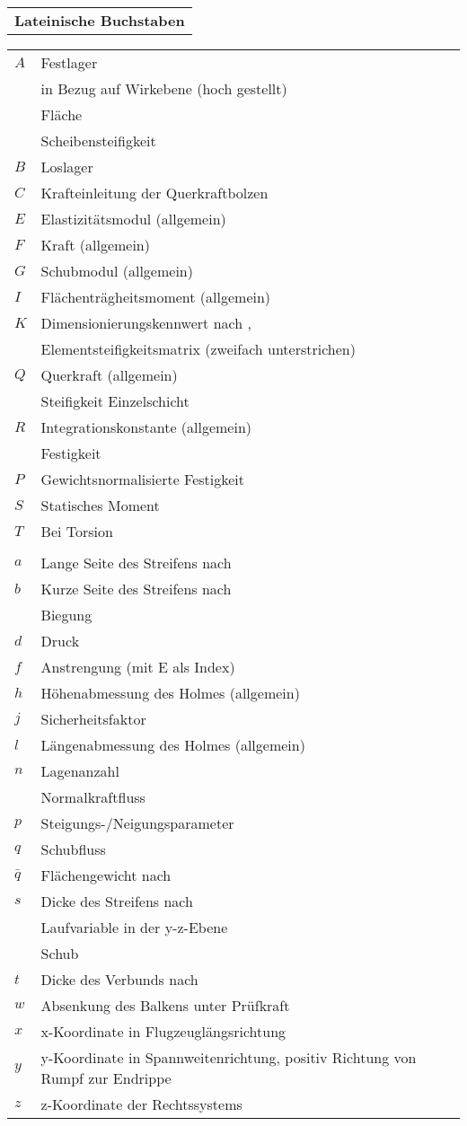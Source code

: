 \begin{longtable}[l]{l}
\onehalfspacing
\textbf{Lateinische Buchstaben}
\end{longtable}
\begin{longtable}[l]{ll}
\onehalfspacing
$ A $&Festlager\\
&in Bezug auf Wirkebene (hoch gestellt)\\
&Fläche\\
&Scheibensteifigkeit\\
$ B $&Loslager\\
$ C $&Krafteinleitung der Querkraftbolzen\\
$ E $&Elastizitätsmodul (allgemein)\\
$ F $&Kraft (allgemein)\\
$ G $&Schubmodul (allgemein)\\
$ I $&Flächenträgheitsmoment (allgemein)\\
$ K $&Dimensionierungskennwert nach \cite{item5},\\
 &Elementsteifigkeitsmatrix (zweifach unterstrichen)\\
$ Q $&Querkraft (allgemein)\\
&Steifigkeit Einzelschicht\\
$ R $&Integrationskonstante (allgemein)\\
&Festigkeit\\
$ P $&Gewichtsnormalisierte Festigkeit\\
$ S $&Statisches Moment\\
$ T $&Bei Torsion\\
& \\
$ a $&Lange Seite des Streifens nach \cite{item1}\\
$ b $&Kurze Seite des Streifens nach \cite{item1}\\
&Biegung\\
$ d$& Druck\\
$ f $&Anstrengung (mit E als Index)\\
$ h $&Höhenabmessung des Holmes (allgemein)\\
$ j $&Sicherheitsfaktor\\
$ l $&Längenabmessung des Holmes (allgemein)\\
$ n $&Lagenanzahl\\
&Normalkraftfluss\\
$ p $&Steigungs-/Neigungsparameter\\
$ q $&Schubfluss\\
$ \bar{q} $&Flächengewicht nach \cite{item5}\\
$ s $&Dicke des Streifens nach \cite{item1}\\
&Laufvariable in der y-z-Ebene\\
& Schub\\
$ t $&Dicke des Verbunds nach \cite{item3}\\
$ w $&Absenkung des Balkens unter Prüfkraft\\
$ x $&x-Koordinate in Flugzeuglängsrichtung\\
$ y $&y-Koordinate in Spannweitenrichtung, positiv Richtung von Rumpf zur Endrippe\\
$ z $&z-Koordinate der Rechtssystems\\
\end{longtable}
